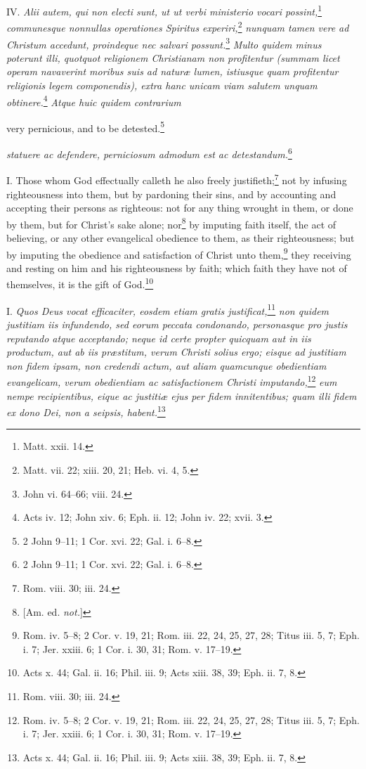 IV. \emph{Alii autem, qui non electi sunt, ut ut verbi ministerio vocari possint,}\footnote{Matt. xxii. 14.}\emph{ communesque nonnullas operationes Spiritus experiri,}\footnote{Matt. vii. 22; xiii. 20, 21; Heb. vi. 4, 5.}\emph{ nunquam tamen vere ad Christum accedunt, proindeque nec salvari possunt.}\footnote{John vi. 64–66; viii. 24.}\emph{ Multo quidem minus poterunt illi, quotquot religionem Christianam non profitentur (summam licet operam navaverint moribus suis ad naturæ lumen, istiusque quam profitentur religionis legem componendis), extra hanc unicam viam salutem unquam obtinere.}\footnote{Acts iv. 12; John xiv. 6; Eph. ii. 12; John iv. 22; xvii. 3.}\emph{ Atque huic quidem contrarium }

very pernicious, and to be detested.\footnote{2 John 9–11; 1 Cor. xvi. 22; Gal. i. 6–8.}

\emph{statuere ac defendere, perniciosum admodum est ac detestandum.}\footnote{2 John 9–11; 1 Cor. xvi. 22; Gal. i. 6–8.}


I. Those whom God effectually calleth he also freely justifieth;\footnote{Rom. viii. 30; iii. 24.} not by infusing righteousness into them, but by pardoning their sins, and by accounting and accepting their persons as righteous: not for any thing wrought in them, or done by them, but for Christ's sake alone; nor\footnote{[Am. ed. \emph{not.}]} by imputing faith itself, the act of believing, or any other evangelical obedience to them, as their righteousness; but by imputing the obedience and satisfaction of Christ unto them,\footnote{Rom. iv. 5–8; 2 Cor. v. 19, 21; Rom. iii. 22, 24, 25, 27, 28; Titus iii. 5, 7; Eph. i. 7; Jer. xxiii. 6; 1 Cor. i. 30, 31; Rom. v. 17–19.} they receiving and resting on him and his righteousness by faith; which faith they have not of themselves, it is the gift of God.\footnote{Acts x. 44; Gal. ii. 16; Phil. iii. 9; Acts xiii. 38, 39; Eph. ii. 7, 8.}

I. \emph{Quos Deus vocat efficaciter, eosdem etiam gratis justificat,}\footnote{Rom. viii. 30; iii. 24.}\emph{ non quidem justitiam iis infundendo, sed eorum peccata condonando, personasque pro justis reputando atque acceptando; neque id certe propter quicquam aut in iis productum, aut ab iis præstitum, verum Christi solius ergo; eisque ad justitiam non fidem ipsam, non credendi actum, aut aliam quamcunque obedientiam evangelicam, verum obedientiam ac satisfactionem Christi imputando,}\footnote{Rom. iv. 5–8; 2 Cor. v. 19, 21; Rom. iii. 22, 24, 25, 27, 28; Titus iii. 5, 7; Eph. i. 7; Jer. xxiii. 6; 1 Cor. i. 30, 31; Rom. v. 17–19.}\emph{ eum nempe recipientibus, eique ac justitiæ ejus per fidem innitentibus; quam illi fidem ex dono Dei, non a seipsis, habent.}\footnote{Acts x. 44; Gal. ii. 16; Phil. iii. 9; Acts xiii. 38, 39; Eph. ii. 7, 8.}

